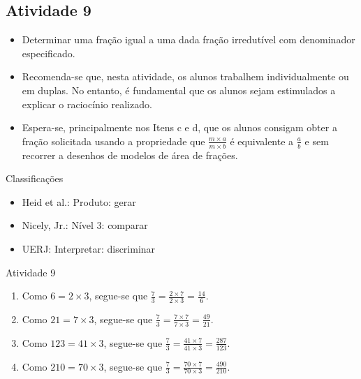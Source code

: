 \begin{multicols}{2}
\subsection{Atividade 9}

\begin{itemize} %
    \item       Determinar uma fração igual a uma dada fração irredutível com 
denominador especificado.
\end{itemize} %
  
  
 
  
\begin{itemize} %
    \item       Recomenda-se que, nesta atividade, os alunos trabalhem 
individualmente ou em duplas. No entanto, é fundamental que os alunos sejam 
estimulados a explicar o raciocínio realizado.
    \item       Espera-se, principalmente nos Itens c e d, que os alunos 
consigam obter a fração solicitada usando a propriedade que       $\frac{m 
\times a}{m \times b}$       é equivalente a       $\frac{a}{b}$       e sem 
recorrer a desenhos de modelos de área de frações.
\end{itemize} %
  
  
  Classificações  
\begin{itemize} %
    \item       Heid et al.: Produto: gerar
    \item       Nicely, Jr.: Nível 3: comparar
    \item       UERJ: Interpretar: discriminar
\end{itemize} %


\begin{resposta*}{Atividade 9}
\begin{enumerate} [\quad a)] %
    \item       Como       $6 = 2 \times 3$, segue-se que       $\frac{7}{3} = 
\frac{2 \times 7}{2 \times 3} = \frac{14}{6}$.
    \item       Como       $21 = 7 \times 3$, segue-se que       $\frac{7}{3} = 
\frac{7 \times 7}{7 \times 3} = \frac{49}{21}$.
    \item       Como       $123 = 41 \times 3$, segue-se que       $\frac{7}{3} 
= \frac{41 \times 7}{41 \times 3} = \frac{287}{123}$.
    \item       Como       $210 = 70 \times 3$, segue-se que       $\frac{7}{3} 
= \frac{70 \times 7}{70 \times 3} = \frac{490}{210}$.
\end{enumerate} %
\end{resposta*}


\end{multicols}
